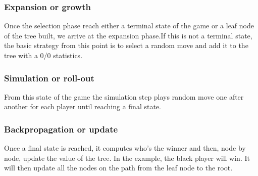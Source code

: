 \subsubsection{Expansion or growth}
Once the selection phase reach either a terminal state of the game or a leaf node of the tree built, we arrive at the expansion phase.If this is not a terminal state, the basic strategy from this point is to select a random move and add it to the tree with a 0/0 statistics. 

\begin{center}
\end{center}

\subsubsection{Simulation or roll-out}

From this state of the game the simulation step plays random move one after another for each player until reaching a final state. 

\subsubsection{Backpropagation or update}
Once a final state is reached, it computes who's the winner and then, node by node, update the value of the tree. In the example, the black player will win. It will then update all the nodes on the path from the leaf node to the root. 

\begin{center}
\end{center}


